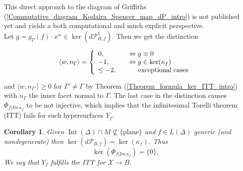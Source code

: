 \documentclass[12pt, english]{article}
\newtheorem{corollar}[definition]{Corollary}
\DeclareMathOperator{\Int}{Int}
\begin{document}
This direct approach to the diagram of Griffiths (\ref{Commutative_diagram_Kodaira_Spencer_map_dP_intro}) is not published yet and yields a both computational and much explicit perspective. 
\leavevmode 
\\
Let $g = g_{\Gamma}(f) \cdot x^w \in \ker(d \mathcal{P}_{B,f}^1)$. Then we get the distinction
\begin{equation} \label{distinction_scalar_product_0_minus1_getminus2}
	\begin{tikzcd}
		\langle w,n_{\Gamma} \rangle = \left\{\begin{array}{lll} 0, & \Leftrightarrow g \equiv 0 \\
			-1, &  \Leftrightarrow g \in \ker(\kappa_f) \\
			\leq -2, & \quad \, \, \textrm{exceptional cases}
		\end{array}\right.
	\end{tikzcd}
\end{equation}
and $\langle w,n_{\Gamma'} \rangle \geq 0$ for $\Gamma' \neq \Gamma$ by Theorem (\ref{Theorem_formula_ker_ITT_intro}) with $n_{\Gamma}$ the inner facet normal to $\Gamma$. The last case in the distinction causes $\Phi_{f \vert{Im \, \kappa_f}}$ to be not injective, which implies that the infinitesimal Torelli theorem (ITT) fails for such hypersurfaces $Y_f$. %
\begin{corollar}
	Given $\Int(\Delta) \cap M \nsubseteq \{\textrm{plane}\}$ and $f \in L(\Delta)$ generic (and nondegenerate) then $\ker(d \mathcal{P}_{B,f}) = \ker(\kappa_f)$. Thus
\[  \ker(\Phi_{f \vert{Im \, \kappa_f}}) = \{ 0  \},  \]
We say that $Y_f$ fulfills the ITT for $\mathcal{X} \rightarrow B$.  
\end{corollar}
\end{document}
